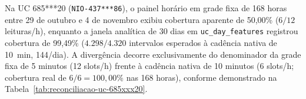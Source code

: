 Na UC 685***20 (\texttt{NIO-437***86}), o painel horário em grade fixa de 168 horas entre 29 de outubro e 4 de novembro exibiu cobertura aparente de 50,00\% ($6/12$ leituras/h), enquanto a janela analítica de 30 dias em \texttt{uc\_day\_features} registrou cobertura de 99,49\% ($4.298/4.320$ intervalos esperados à cadência nativa de 10~min, 144/dia). A divergência decorre exclusivamente do denominador da grade fixa de 5 minutos (12 slots/h) frente à cadência nativa de 10 minutos (6 slots/h; cobertura real de $6/6 = 100{,}00\%$ nas 168 horas), conforme demonstrado na Tabela~\ref{tab:reconciliacao-uc-685xxx20}.




